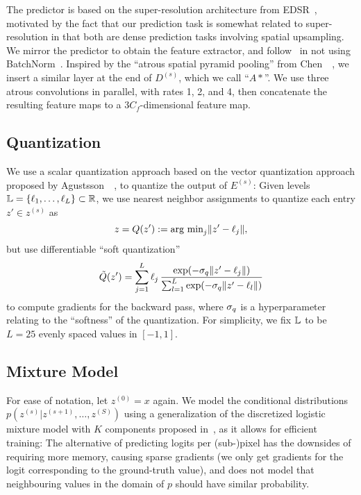 The predictor is based on the super-resolution architecture from EDSR~\cite{Lim_2017_CVPR_Workshops}, motivated by the fact that our prediction task is somewhat related to super-resolution in that both are dense prediction tasks involving spatial upsampling. We mirror the predictor to obtain the feature extractor, and follow~\cite{Lim_2017_CVPR_Workshops} in not using BatchNorm~\cite{ioffe2015batch}.
Inspired by the ``atrous spatial pyramid pooling'' from Chen~\etal~\cite{chen2017rethinking}, we insert a similar layer at the end of $D^{(s)}$, which we call ``$A*$''. We use three atrous convolutions in parallel, with rates 1, 2, and 4, then concatenate the resulting feature maps to a $3C_f$-dimensional feature map. 



\subsection{Quantization}\label{l3c:sec:quantization}


We use a scalar quantization approach based on the vector quantization approach proposed by Agustsson~\etal~\cite{agustsson2017soft}, 
to quantize the output of $E^{(s)}$: Given levels $\mathbb{L} = \{\ell_1, \dots, \ell_L\} \subset \mathbb{R}$, we use nearest neighbor assignments to quantize each entry $z' \in z^{(s)}$ as
\begin{equation} \label{l3c:eq:hardquant}
z = Q(z') := \text{arg min}_{j} \|z'-\ell_j\|,
\end{equation}
but use differentiable ``soft quantization''
\begin{equation} 
\tilde Q(z') = \sum_{j=1}^L  \ell_j \, \frac{\exp(-\sigma_q\|z'-\ell_j\|)}{\sum_{l=1}^L \exp(-\sigma_q\|z'-\ell_l\|)} \label{l3c:eq:softquant}
\end{equation}
to compute gradients for the backward pass, where $\sigma_q$ is a hyperparameter relating to the ``softness'' of the quantization. 
For simplicity, we fix $\mathbb{L}$ to be $L=25$ evenly spaced values in $[-1, 1]$. 


\subsection{Mixture Model} \label{l3c:sec:mixture_model}

For ease of notation, let $z^{(0)}=x$ again. We model the conditional distributions
$p(z^{(s)}|z^{(s+1)}, \ldots, z^{(S)})$
using a generalization of the discretized logistic mixture model with $K$ components proposed in~\cite{Salimans2017pcnnpp}, as it allows for efficient training: 
The alternative of predicting logits per \mbox{(sub-)pixel} has the downsides of requiring more memory, causing sparse gradients (we only get gradients for the logit corresponding to the ground-truth value), and does not model that neighbouring values in the domain of $p$ should have similar probability. 

